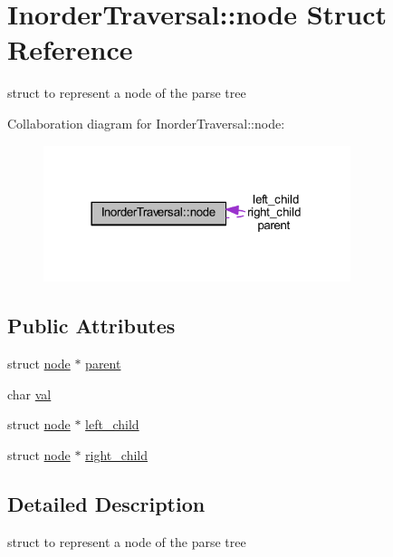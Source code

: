 \hypertarget{struct_inorder_traversal_1_1node}{}\section{Inorder\+Traversal\+:\+:node Struct Reference}
\label{struct_inorder_traversal_1_1node}


struct to represent a node of the parse tree  




Collaboration diagram for Inorder\+Traversal\+:\+:node\+:\nopagebreak
\begin{figure}[H]
\begin{center}
\leavevmode
\includegraphics[width=254pt]{struct_inorder_traversal_1_1node__coll__graph}
\end{center}
\end{figure}
\subsection*{Public Attributes}
\begin{DoxyCompactItemize}
\item 
struct \mbox{\hyperlink{struct_inorder_traversal_1_1node}{node}} $\ast$ \mbox{\hyperlink{struct_inorder_traversal_1_1node_aa58b614b269c3b4d3b9240165d820b14}{parent}}
\item 
char \mbox{\hyperlink{struct_inorder_traversal_1_1node_ad27be9fbd1238d856d52eddcb61f8563}{val}}
\item 
struct \mbox{\hyperlink{struct_inorder_traversal_1_1node}{node}} $\ast$ \mbox{\hyperlink{struct_inorder_traversal_1_1node_abe2033bf83816d4df11f247bc739440b}{left\+\_\+child}}
\item 
struct \mbox{\hyperlink{struct_inorder_traversal_1_1node}{node}} $\ast$ \mbox{\hyperlink{struct_inorder_traversal_1_1node_ac6e7ee4328d89ecf0529a8ef5d6fedf9}{right\+\_\+child}}
\end{DoxyCompactItemize}


\subsection{Detailed Description}
struct to represent a node of the parse tree 

